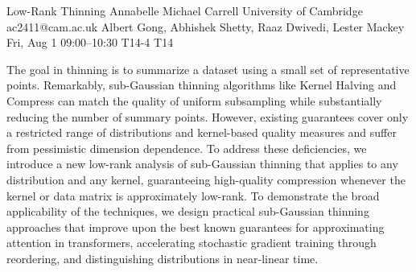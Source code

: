 \begin{talk}
  {Low-Rank Thinning}%
  {Annabelle Michael Carrell}%
  {University of Cambridge}%
  {ac2411@cam.ac.uk}%
  {Albert Gong, Abhishek Shetty, Raaz Dwivedi, Lester Mackey}%
  {}%
  {Fri, Aug 1 09:00–10:30}%
  {T14-4}%
  {T14}%
  
				
			
The goal in thinning is to summarize a dataset using a small set of representative points. Remarkably, sub-Gaussian thinning algorithms like Kernel Halving and Compress can match the quality of uniform subsampling while substantially reducing the number of summary points. However, existing guarantees cover only a restricted range of distributions and kernel-based quality measures and suffer from pessimistic dimension dependence. To address these deficiencies, we introduce a new low-rank analysis of sub-Gaussian thinning that applies to any distribution and any kernel, guaranteeing high-quality compression whenever the kernel or data matrix is approximately low-rank. To demonstrate the broad applicability of the techniques, we design practical sub-Gaussian thinning approaches that improve upon the best known guarantees for approximating attention in transformers, accelerating stochastic gradient training through reordering, and distinguishing distributions in near-linear time. 

\medskip

\end{talk}

